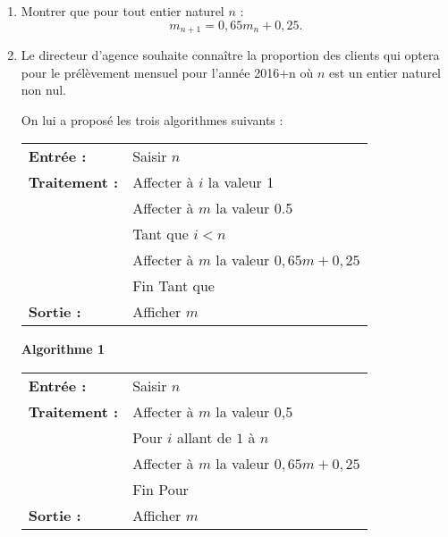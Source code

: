 \begin{enumerate}
     \item %
     Montrer que pour tout entier naturel $n$ :
     \[ m_{n+1}=0,65m_n + 0,25. \]
     \item %
     Le directeur d'agence souhaite connaître la proportion des clients qui optera pour le prélèvement mensuel pour l'année 2016+n où $n$ est un entier naturel non nul.
     \par
     On lui a proposé les trois algorithmes suivants :
     \par
     \begin{center}
          \begin{extern}%
               \begin{tabular}{|l l|}\hline
                    \textbf{Entrée :}	& 	Saisir $n$\\
                    \textbf{Traitement :}	& Affecter à $i$ la valeur 1 \\
                    & Affecter à $m$ la valeur 0.5\\
                    & Tant que $i < n$\\
                    &\qquad Affecter à $m$ la valeur $0,65m + 0,25$ \\
                    &Fin Tant que\\
                    \textbf{Sortie :}		&Afficher $m$ \\ \hline
               \end{tabular}
          \end{extern}
          \par
          \textbf{Algorithme 1}
     \end{center}
     \begin{center}
          \begin{extern}%
               \begin{tabular}{|l l|}\hline
                    \textbf{Entrée :}	& 	Saisir $n$\\
                    \textbf{Traitement :} & Affecter à $m$ la valeur 0,5\\
                    & Pour $i$ allant de $1$ à $n$\\
                    &\qquad Affecter à $m$ la valeur $0,65m + 0,25$ \\
                    &Fin Pour\\
                    \textbf{Sortie :}		&Afficher $m$ \\ \hline
               \end{tabular}

\end{extern}
\end{center}
\end{enumerate}
